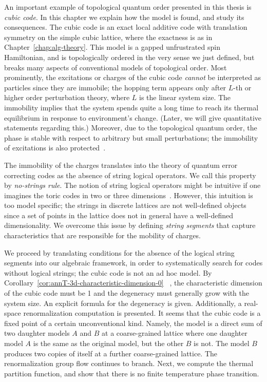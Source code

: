 An important example of topological quantum order 
presented in this thesis is \emph{cubic code}.
In this chapter we explain how the model is found,
and study its consequences.
The cubic code is an exact local additive code with translation symmetry 
on the simple cubic lattice, 
where the exactness is as in Chapter~\ref{chap:alg-theory}.
This model is a gapped unfrustrated spin Hamiltonian,
and is topologically ordered in the very sense we just defined,
but breaks many aspects of conventional models of topological order.
Most prominently, the excitations or charges of the cubic code
\emph{cannot} be interpreted as particles
since they are immobile;
the hopping term appears only after $L$-th
or higher order perturbation theory, where $L$ is the linear system size.
The immobility implies that the system spends
quite a long time to reach its thermal equilibrium
in response to environment's change.
(Later, we will give quantitative statements regarding this.)
Moreover, due to the topological quantum order,
the phase is stable with respect to arbitrary but small perturbations;
the immobility of excitations is also protected~\cite{BravyiHastingsMichalakis2010stability}.


The immobility of the charges translates 
into the theory of quantum error correcting codes
as the absence of string logical operators.
We call this property by \emph{no-strings rule}.
The notion of string logical operators might be intuitive
if one imagines the toric codes in two or three 
dimensions~\cite{DennisKitaevLandahlEtAl2002Topological}.
However, this intuition is too model specific;
the strings in discrete lattices are not well-defined objects
since a set of points in the lattice does not in general have
a well-defined dimensionality.
We overcome this issue by defining \emph{string segments}
that capture characteristics that are responsible for the mobility of charges.

We proceed by translating conditions for the absence of the logical string segments
into our algebraic framework,
in order to systematically search for codes without logical strings;
the cubic code is not an ad hoc model.
By Corollary~\ref{cor:annT-3d-characteristic-dimension-0}%
~\cite{Yoshida2011feasibility},
the characteristic dimension of the cubic code must be 1
and the degeneracy must generally grow with the system size.
An explicit formula for the degeneracy is given.
Additionally, a real-space renormalization computation is presented.
It seems that the cubic code is a fixed point of a certain unconventional kind.
Namely, the model is a direct sum of two daughter models $A$ and $B$ at a coarse-grained lattice
where one daughter model $A$ is the same as the original model, but the other $B$ is not.
The model $B$ produces two copies of itself at a further coarse-grained lattice.
The renormalization group flow continues to branch.
Next, we compute the thermal partition function,
and show that there is no finite temperature phase transition.

